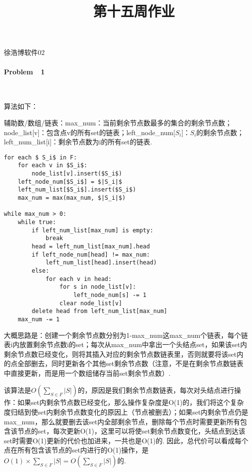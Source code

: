 \documentclass[UTF8]{ctexart}
\begin{document}
\renewcommand{\thefootnote}{\fnsymbol{footnote}}
\linespread{1.4}
\title{\vspace{-5em}\ \ 第十五周作业\vspace{-2.5em}}
\date{}
\maketitle
\begin{center}
{\fangsong 徐浩博\quad 软件02}
\end{center}

\paragraph*{Problem\ \ 1\ \ }\ \par
算法如下：\par
辅助数/数组/链表：max\_num：当前剩余节点数最多的集合的剩余节点数；node\_list[v]：包含点v的所有set的链表；left\_node\_num[$S_i$]：$S_i$的剩余节点数；left\_num\_list[i]：剩余节点数为i的所有set的链表.

\begin{lstlisting}[mathescape=true]
for each $ S_i$ in F:
    for each v in $S_i$:
        node_list[v].insert($S_i$)
    left_node_num[$S_i$] = $|S_i|$
    left_num_list[$S_i$].insert($S_i$)
    max_num = max(max_num, $|S_i|$)

while max_num > 0:
    while true:
        if left_num_list[max_num] is empty:
            break
        head = left_num_list[max_num].head
        if left_node_num[head] != max_num:
            left_num_list[head].insert(head)
        else:
            for each v in head:
                for s in node_list[v]:
                    left_node_num[s] -= 1
                clear node_list[v]
        delete head from left_num_list[max_num]
    max_num -= 1
\end{lstlisting}
大概思路是：创建一个剩余节点数分别为1-max\_num这max\_num个链表，每个链表i内放置剩余节点数i的set；每次从max\_num中拿出一个头结点set，如果该set内剩余节点数已经变化，则将其插入对应的剩余节点数链表里，否则就要将该set内的点全部删去，同时更新各个其他set剩余节点数（注意，不是在剩余节点数链表中直接更新，而是用一个数组储存当前set剩余节点数）.\par
该算法是$O(\sum_{S\in F}|S|)$的，原因是我们剩余节点数链表，每次对头结点进行操作：如果set内剩余节点数已经变化，那么操作复杂度是O(1)的，我们将这个复杂度归结到使set内剩余节点数变化的原因上（节点被删去）；如果set内剩余节点仍是max\_num，那么就要删去该set内全部剩余节点，删除每个节点时需要更新所有包含该节点的set，每次更新O(1)，这里可以将使set剩余节点数变化，头结点到达该set时需要O(1)更新的代价也加进来，一共也是O(1)的. 因此，总代价可以看成每个点在所有包含该节点的set内进行的O(1)操作，是$O(1)\times \sum_{S\in F}|S|=O(\sum_{S\in F}|S|)$的.
\end{document}
